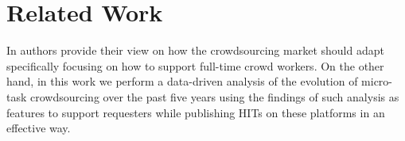 \section{Related Work}\label{sec:relwork}

In \cite{Kittur:2013:FCW:2441776.2441923} authors provide their view on how the crowdsourcing market should adapt specifically focusing on how to  support full-time crowd workers. On the other hand, in this work we perform a data-driven analysis of the evolution of micro-task crowdsourcing over the past five years using the findings of such analysis as features to support requesters while publishing HITs on these platforms in an effective way.